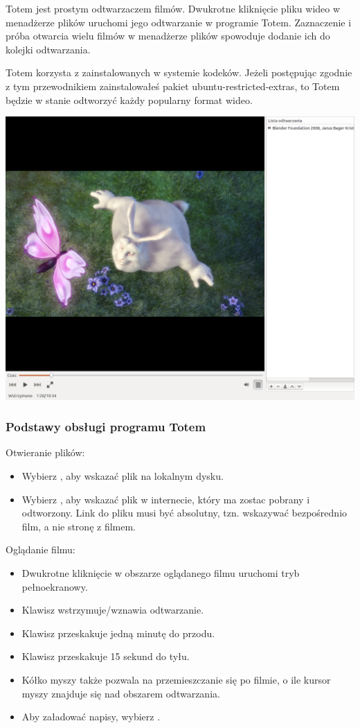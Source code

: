 Totem jest prostym odtwarzaczem filmów. Dwukrotne kliknięcie pliku wideo w menadżerze plików uruchomi jego odtwarzanie w programie Totem. Zaznaczenie i próba otwarcia wielu filmów w menadżerze plików spowoduje dodanie ich do kolejki odtwarzania. 

Totem korzysta z zainstalowanych w systemie kodeków. Jeżeli postępując zgodnie z tym przewodnikiem zainstalowałeś pakiet \textcolor{ubuntu_orange}{ubuntu-restricted-extras}, to Totem będzie w stanie odtworzyć każdy popularny format wideo.
\begin{center}
	\includegraphics[width=\linewidth]{images/programy_totem1.png}
\end{center}

\subsubsection{Podstawy obsługi programu Totem}
Otwieranie plików:
\begin{itemize}
\item Wybierz , aby wskazać plik na lokalnym dysku.
\item Wybierz , aby wskazać plik w internecie, który ma zostac pobrany i odtworzony. Link do pliku musi być absolutny, tzn. wskazywać bezpośrednio film, a nie stronę z filmem.
\end{itemize}
Oglądanie filmu:
\begin{itemize}
\item Dwukrotne kliknięcie w obszarze oglądanego filmu uruchomi tryb pełnoekranowy.
\item Klawisz \keys{\Space} wstrzymuje/wznawia odtwarzanie.
\item Klawisz \keys{\arrowkeyright} przeskakuje jedną minutę do przodu.
\item Klawisz \keys{\arrowkeyleft} przeskakuje 15 sekund do tyłu.
\item Kółko myszy także pozwala na przemieszczanie się po filmie, o ile kursor myszy znajduje się nad obszarem odtwarzania.
\item Aby załadować napisy, wybierz .
\end{itemize}

